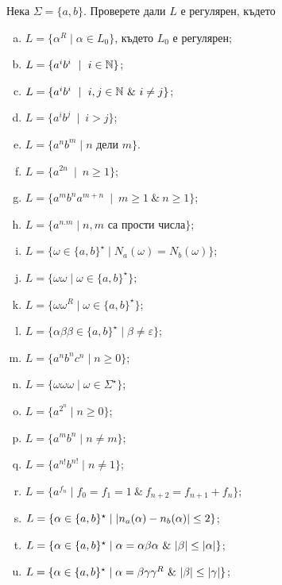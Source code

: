 \begin{problem}
  Нека $\Sigma = \{a,b\}$.  Проверете дали $L$ е регулярен, където
  \begin{enumerate}[a)]
  \item
    $L = \{\alpha^R \mid \alpha \in L_0\}$, където $L_0$ е регулярен;
  \item
    $L = \{a^ib^i\ \mid\ i\in\Nat\}$;
  \item
    $L = \{a^ib^i\ \mid\ i,j\in\Nat\ \&\ i\neq j\}$;
  \item
    $L = \{a^ib^j\ \mid\ i > j\}$;
  \item
    $L = \{a^nb^m \mid n\mbox{ дели }m\}$.
  \item
    $L = \{a^{2n}\ \mid\ n\geq 1\}$;
  \item
    $L = \{a^mb^na^{m+n}\ \mid\ m\geq 1\ \&\ n\geq 1\}$;
  \item
    $L = \{a^{n.m}\mid n,m\mbox{ са прости числа}\}$;
  \item
    $L = \{\omega\in\{a,b\}^\star \mid N_a(\omega) = N_b(\omega)\}$;
  \item
    $L = \{\omega\omega\mid \omega\in\{a,b\}^\star\}$;
  \item
    $L = \{\omega\omega^R\mid \omega\in\{a,b\}^\star\}$;
  \item
    $L = \{\alpha\beta\beta \in \{a,b\}^\star\mid \beta \neq \varepsilon\}$;
  \item
    $L = \{a^nb^nc^n\mid n\geq 0\}$;
  \item
    $L = \{\omega\omega\omega\mid \omega\in \Sigma^\star\}$;
  \item
    $L = \{a^{2^n}\mid n\geq 0\}$;
  \item
    $L = \{a^mb^n\mid n\neq m\}$;
  \item
    $L = \{a^{n!}b^{n!}\mid n\neq 1\}$;
  \item
    $L = \{a^{f_n} \mid f_0 = f_1 = 1\ \&\ f_{n+2} = f_{n+1} + f_{n}\}$;
  \item
    $L = \{\alpha \in \{a,b\}^\star \mid \lvert{n_a(\alpha) - n_b(\alpha)}\rvert \leq 2\}$;
  \item
    $L = \{\alpha \in \{a,b\}^\star \mid \alpha = \alpha\beta\alpha\ \&\ \lvert{\beta}\rvert \leq \lvert{\alpha}\rvert\}$;
  \item
    $L = \{\alpha \in \{a,b\}^\star \mid \alpha = \beta\gamma\gamma^R\ \&\ \lvert{\beta}\rvert \leq \lvert{\gamma}\rvert\}$;

\end{enumerate}
\end{problem}
